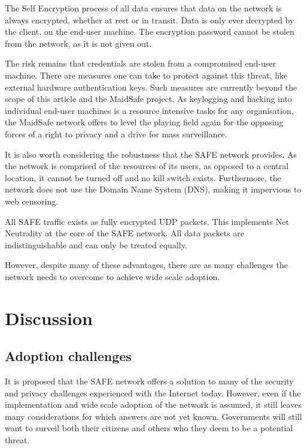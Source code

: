 \documentclass[twocolumn,english]{article}
\begin{document}
The Self Encryption process of all data ensures that data on the network is
always encrypted, whether at rest or in transit. Data is only
ever decrypted by the client, on the end-user machine.  The encryption
password cannot be stolen from the network, as it is not given out.  

The risk remains that credentials are stolen from a compromised end-user machine.  There are measures one can take to protect against this threat, like external hardware authentication keys.  Such measures are currently beyond the scope of this article and the MaidSafe project.  As keylogging and hacking into individual end-user machines is a resource intensive tasks for any organisation, the MaidSafe network offers to level the playing field again for the opposing forces of a right to privacy and a drive for mass surveillance.

It is also worth considering the robustness that the SAFE network
provides. As the network is comprised of the resources of its users,
as opposed to a central location, it cannot be turned off and no kill
switch exists. Furthermore, the network does not use the Domain Name
System (DNS), making it impervious to web censoring. %

All SAFE traffic exists as fully encrypted UDP packets. This implements Net Neutrality at the core of the SAFE network.  All data packets are indistinguishable and can only be treated equally.

However, despite many of these advantages, there
are as many challenges the network needs to overcome to achieve
wide scale adoption.


\section{Discussion}

\subsection{Adoption challenges}

It is proposed that the SAFE network offers a solution to many of
the security and privacy challenges experienced with the Internet
today. However, even if the implementation and wide scale adoption
of the network is assumed, it still leaves many considerations for
which answers are not yet known. Governments will still want to surveil
both their citizens and others who they deem to be a potential threat.
\end{document}
